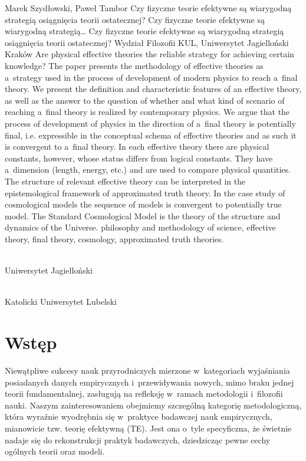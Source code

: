 \begin{artplenv2auth}{Marek Szydłowski, Paweł Tambor}
	{Czy fizyczne teorie efektywne są wiarygodną strategią osiągnięcia teorii ostatecznej?}
	{Czy fizyczne teorie efektywne są wiarygodną strategią\ldots}
	{Czy fizyczne teorie efektywne są wiarygodną strategią osiągnięcia teorii ostatecznej?}
	{Wydział Filozofii KUL, Uniwersytet Jagielloński Kraków}
	{Are physical effective theories the reliable strategy for achieving certain knowledge?}
	{The paper presents the methodology of effective theories as a~strategy used in the process of development of modern physics to reach a~final theory. We present the definition and characteristic features of an effective theory, as well as the answer to the question of whether and what kind of scenario of reaching a~final theory is realized by contemporary physics. We argue that the process of development of physics in the direction of a~final theory is potentially final, i.e. expressible in the conceptual schema of effective theories and as such it is convergent to a~final theory. In each effective theory there are physical constants, however, whose status differs from logical constants. They have a~dimension (length, energy, etc.) and are used to compare physical quantities. The structure of relevant effective theory can be interpreted in the epistemological framework of approximated truth theory. In the case study of cosmological models the sequence of models is convergent to potentially true model. The Standard Cosmological Model is the theory of the structure and dynamics of the Universe.}
	{philosophy and methodology of science, effective theory, final theory, cosmology, approximated truth theories.}
	{%
			{\flushright{}\\\subsubsectit\small{Uniwersytet Jagielloński}\par}%
			{\flushright{}\\\subsubsectit\small{Katolicki Uniwersytet Lubelski}\par}%
		}


\section{Wstęp}
\lettrine[loversize=0.13,lines=2,lraise=-0.04,nindent=0em,findent=0.2pt]%
{N}{}iewątpliwe sukcesy nauk przyrodniczych mierzone w~kategoriach wyjaśniania posiadanych danych empirycznych i~przewidywania nowych, mimo braku jednej teorii fundamentalnej, zasługują na refleksję w~ramach metodologii i~filozofii nauki. Naszym zainteresowaniem obejmiemy szczególną kategorię metodologiczną, która wyraźnie wyodrębnia się w~praktyce badawczej nauk empirycznych, mianowicie tzw. teorię efektywną (TE). Jest ona o~tyle specyficzna, że świetnie nadaje się do rekonstrukcji praktyk badawczych, dziedzicząc pewne cechy ogólnych teorii oraz modeli.


\end{artplenv2auth}
